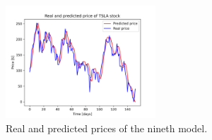 \begin{figure}
\includegraphics[width=0.5\textwidth]{./graf/model9/TSLA.png}
\caption{Real and predicted prices of the nineth model.}
\label{fig:label}
\end{figure} 